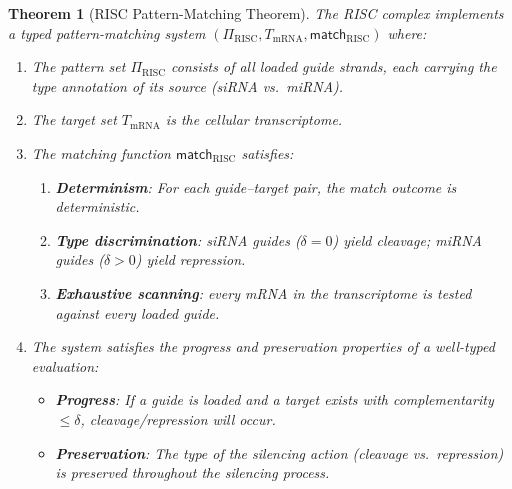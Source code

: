 \documentclass[12pt,a4paper]{article}
\newtheorem{theorem}{Theorem}[section]
\theoremstyle{definition}
\newcommand{\RISC}{\mathrm{RISC}}
\begin{document}
\begin{theorem}[RISC Pattern-Matching Theorem]\label{thm:risc}
The RISC complex implements a typed pattern-matching system
$(\Pi_{\RISC}, T_{\text{mRNA}}, \mathsf{match}_{\RISC})$ where:
\begin{enumerate}[label=(\roman*)]
  \item The pattern set $\Pi_{\RISC}$ consists of all loaded guide
    strands, each carrying the type annotation of its source
    (siRNA vs.\ miRNA).
  \item The target set $T_{\text{mRNA}}$ is the cellular transcriptome.
  \item The matching function $\mathsf{match}_{\RISC}$ satisfies:
    \begin{enumerate}[label=(\alph*)]
      \item \textbf{Determinism}: For each guide--target pair,
        the match outcome is deterministic.
      \item \textbf{Type discrimination}: siRNA guides ($\delta = 0$)
        yield cleavage; miRNA guides ($\delta > 0$) yield repression.
      \item \textbf{Exhaustive scanning}: every mRNA in the
        transcriptome is tested against every loaded guide.
    \end{enumerate}
  \item The system satisfies the \emph{progress} and \emph{preservation}
    properties of a well-typed evaluation:
    \begin{itemize}
      \item \textbf{Progress}: If a guide is loaded and a target
        exists with complementarity $\leq \delta$, cleavage/repression
        will occur.
      \item \textbf{Preservation}: The type of the silencing action
        (cleavage vs.\ repression) is preserved throughout the
        silencing process.
    \end{itemize}
\end{enumerate}
\end{theorem}
\end{document}
